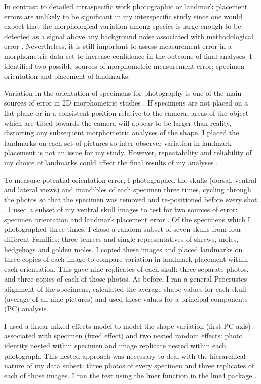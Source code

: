 	In contrast to detailed intraspecific work \citep[e.g.][]{Bornholdt2008, Blagojevic2011} photographic or landmark placement errors are unlikely to be significant in my interspecific study since one would expect that the morphological variation among species is large enough to  be detected as a signal above any background noise associated with methodological error \citep{Arnqvist1998}. Nevertheless, it is still important to assess measurement error in a morphometric data set to increase confidence in the outcome of final analyses.
	I identified two possible sources of morphometric measurement error; specimen orientation and placement of landmarks.

	Variation in the orientation of specimens for photography is one of the main sources of error in 2D morphometric studies \citep{Adriaens2007}. If specimens are not placed on a flat plane or in a consistent position relative to the camera, areas of the object which are tilted towards the camera will appear to be larger than reality, distorting any subsequent morphometric analyses of the shape. 
	I placed the landmarks on each set of pictures so inter-observer variation in landmark placement is not an issue for my study.  However, repeatability and reliability of my choice of landmarks could affect the final results of my analyses \citep{Arnqvist1998}.


	To measure potential orientation error, I photographed the skulls (dorsal, ventral and lateral views) and mandibles of each specimen three times, cycling through the photos so that the specimen was removed and re-positioned before every shot \citep{Viscosi2011}.
	I used a subset of my ventral skull images to test for two sources of error: specimen orientation and landmark placement error \citep{Arnqvist1998, Barrow2008}. Of the specimens which I photographed three times,  I chose a random subset of seven skulls from four different Families: three tenrecs and single representatives of shrews, moles, hedgehogs and golden moles. I copied these images and placed landmarks on three copies of each image to compare variation in landmark placement within each orientation. This gave nine replicates of each skull: three separate photos, and three copies of each of those photos. As before, I ran a general Procrustes alignment \citep{Rohlf1993} of the specimens, calculated the average shape values for each skull (average of all nine pictures) and used these values for a principal components (PC) analysis. 
		
	I used a linear mixed effects model to model the shape variation (first PC axis) associated with specimen (fixed effect) and two nested random effects: photo identity nested within specimen and image replicate nested within each photograph. This nested approach was necessary to deal with the hierarchical nature of my data subset: three photos of every specimen and three replicates of each of those images. I ran the test using the lmer function in the lme4 package \citep{Bates2014}.  

